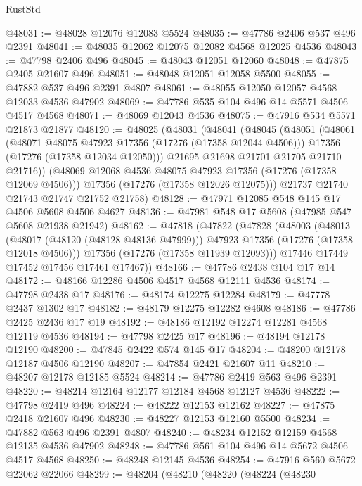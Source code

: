 \begin{lexlean}{RustStd}
\begin{coremodule}
@48031 := @48028 @12076 @12083 @5524
@48035 := @47786 @2406 @537 @496 @2391
@48041 := @48035 @12062 @12075 @12082 @4568 @12025 @4536
@48043 := @47798 @2406 @496
@48045 := @48043 @12051 @12060
@48048 := @47875 @2405 @21607 @496
@48051 := @48048 @12051 @12058 @5500
@48055 := @47882 @537 @496 @2391 @4807
@48061 := @48055 @12050 @12057 @4568 @12033 @4536 @47902
@48069 := @47786 @535 @104 @496 @14 @5571 @4506 @4517 @4568
@48071 := @48069 @12043 @4536
@48075 := @47916 @534 @5571 @21873 @21877
@48120 := @48025
    (@48031
      (@48041
        (@48045
          (@48051
            (@48061
              (@48071 @48075 @47923 @17356 (@17276 (@17358 @12044 @4506)))
              @17356
              (@17276 (@17358 @12034 @12050)))
            @21695
            @21698
            @21701
            @21705
            @21710
            @21716))
        (@48069 @12068 @4536 @48075 @47923 @17356 (@17276 (@17358 @12069 @4506)))
        @17356
        (@17276 (@17358 @12026 @12075)))
      @21737
      @21740
      @21743
      @21747
      @21752
      @21758)
@48128 := @47971 @12085 @548 @145 @17 @4506 @5608 @4506 @4627
@48136 := @47981 @548 @17 @5608 (@47985 @547 @5608 @21938 @21942)
@48162 := @47818
    (@47822
      (@47828
        (@48003
          (@48013
            (@48017 (@48120 (@48128 @48136 @47999)))
            @47923
            @17356
            (@17276 (@17358 @12018 @4506)))
          @17356
          (@17276 (@17358 @11939 @12093)))
        @17446
        @17449
        @17452
        @17456
        @17461
        @17467))
@48166 := @47786 @2438 @104 @17 @14
@48172 := @48166 @12286 @4506 @4517 @4568 @12111 @4536
@48174 := @47798 @2438 @17
@48176 := @48174 @12275 @12284
@48179 := @47778 @2437 @1302 @17
@48182 := @48179 @12275 @12282 @4608
@48186 := @47786 @2425 @2436 @17 @19
@48192 := @48186 @12192 @12274 @12281 @4568 @12119 @4536
@48194 := @47798 @2425 @17
@48196 := @48194 @12178 @12190
@48200 := @47845 @2422 @574 @145 @17
@48204 := @48200 @12178 @12187 @4506 @12190
@48207 := @47854 @2421 @21607 @11
@48210 := @48207 @12178 @12185 @5524
@48214 := @47786 @2419 @563 @496 @2391
@48220 := @48214 @12164 @12177 @12184 @4568 @12127 @4536
@48222 := @47798 @2419 @496
@48224 := @48222 @12153 @12162
@48227 := @47875 @2418 @21607 @496
@48230 := @48227 @12153 @12160 @5500
@48234 := @47882 @563 @496 @2391 @4807
@48240 := @48234 @12152 @12159 @4568 @12135 @4536 @47902
@48248 := @47786 @561 @104 @496 @14 @5672 @4506 @4517 @4568
@48250 := @48248 @12145 @4536
@48254 := @47916 @560 @5672 @22062 @22066
@48299 := @48204
    (@48210
      (@48220
        (@48224
          (@48230

\end{coremodule}
\end{lexlean}
